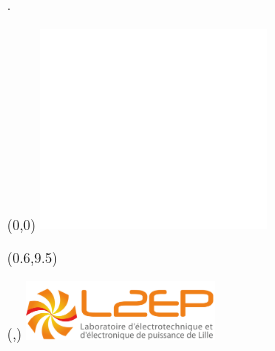 \thispagestyle{empty}
.
\begin{textblock}{5}(0,0)
    \includegraphics [width=60mm]{media/Logo-ULille.png}
	\vspace{300mm}
\end{textblock}

\begin{textblock}{1}(0.6,9.5)
	\Huge{}
\end{textblock}

\begin{textblock}{1}(\hpostt,\vpostt)
    \includegraphics[width=50mm]{media/L2EP.jpg}
\end{textblock}







